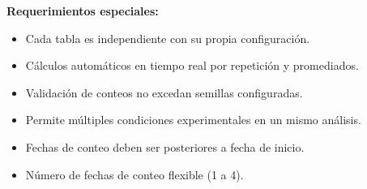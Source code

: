 \vspace{0.5em}
\noindent\textbf{Requerimientos especiales:}
\begin{itemize}[nosep]
    \item Cada tabla es independiente con su propia configuración.
    \item Cálculos automáticos en tiempo real por repetición y promediados.
    \item Validación de conteos no excedan semillas configuradas.
    \item Permite múltiples condiciones experimentales en un mismo análisis.
    \item Fechas de conteo deben ser posteriores a fecha de inicio.
    \item Número de fechas de conteo flexible (1 a 4).
\end{itemize}
